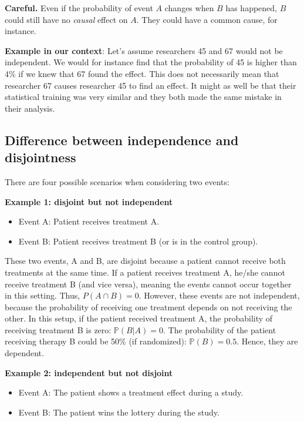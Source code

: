 \documentclass[
]{book}
\providecommand{\tightlist}{%
  \setlength{\itemsep}{0pt}\setlength{\parskip}{0pt}}
\begin{document}
\textbf{Careful.} Even if the probability of event \(A\) changes when \(B\) has happened, \(B\) could still have no \emph{causal} effect on \(A\).
They could have a common cause, for instance.

\textbf{Example in our context}:
Let's assume researchers 45 and 67 would not be independent. We would for instance find that the probability of 45 is higher than 4\% if we knew that 67 found the effect.
This does not necessarily mean that researcher 67 causes researcher 45 to find an effect.
It might as well be that their statistical training was very similar and they both made the same mistake in
their analysis.

\subsection{Difference between independence and disjointness}\label{difference-between-independence-and-disjointness}

There are four possible scenarios when considering two events:

\textbf{Example 1: disjoint but not independent}

\begin{itemize}
\tightlist
\item
  Event A: Patient receives treatment A.
\item
  Event B: Patient receives treatment B (or is in the control group).
\end{itemize}

These two events, A and B, are disjoint because a patient cannot receive both treatments at the same time.
If a patient receives treatment A, he/she cannot receive treatment B (and vice versa), meaning the events cannot occur together in this setting. Thus, \(P(A \cap B) = 0\).
However, these events are not independent, because the probability of receiving one treatment depends on not receiving the other.
In this setup, if the patient received treatment A, the probability of receiving treatment B is zero: \(\mathbb{P}(B|A) = 0\).
The probability of the patient receiving therapy B could be 50\% (if randomized): \(\mathbb{P}(B) = 0.5\). Hence, they are dependent.

\textbf{Example 2: independent but not disjoint}

\begin{itemize}
\tightlist
\item
  Event A: The patient shows a treatment effect during a study.
\item
  Event B: The patient wins the lottery during the study.
\end{itemize}
\end{document}
